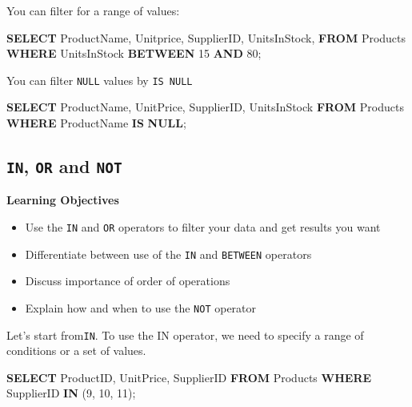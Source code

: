\documentclass[]{book}
\newenvironment{Shaded}{\begin{snugshade}}{\end{snugshade}}
\newcommand{\KeywordTok}[1]{\textcolor[rgb]{0.13,0.29,0.53}{\textbf{{#1}}}}
\newcommand{\DecValTok}[1]{\textcolor[rgb]{0.00,0.00,0.81}{{#1}}}
\newcommand{\NormalTok}[1]{{#1}}
\providecommand{\tightlist}{%
  \setlength{\itemsep}{0pt}\setlength{\parskip}{0pt}}
\theoremstyle{definition}
\theoremstyle{definition}
\theoremstyle{remark}
\begin{document}
You can filter for a range of values:

\begin{Shaded}
\begin{Highlighting}[]
\KeywordTok{SELECT} \NormalTok{ProductName,}
\NormalTok{Unitprice,}
\NormalTok{SupplierID,}
\NormalTok{UnitsInStock,}
\KeywordTok{FROM} \NormalTok{Products}
\KeywordTok{WHERE} \NormalTok{UnitsInStock }\KeywordTok{BETWEEN} \DecValTok{15} \KeywordTok{AND} \DecValTok{80}\NormalTok{;}
\end{Highlighting}
\end{Shaded}

You can filter \texttt{NULL} values by \texttt{IS\ NULL}

\begin{Shaded}
\begin{Highlighting}[]
\KeywordTok{SELECT} \NormalTok{ProductName,}
\NormalTok{UnitPrice,}
\NormalTok{SupplierID,}
\NormalTok{UnitsInStock}
\KeywordTok{FROM} \NormalTok{Products}
\KeywordTok{WHERE} \NormalTok{ProductName }\KeywordTok{IS} \KeywordTok{NULL}\NormalTok{;}
\end{Highlighting}
\end{Shaded}

\subsection{\texorpdfstring{\texttt{IN}, \texttt{OR} and
\texttt{NOT}}{IN, OR and NOT}}\label{in-or-and-not}

\textbf{Learning Objectives}

\begin{itemize}
\tightlist
\item
  Use the \texttt{IN} and \texttt{OR} operators to filter your data and
  get results you want
\item
  Differentiate between use of the \texttt{IN} and \texttt{BETWEEN}
  operators
\item
  Discuss importance of order of operations
\item
  Explain how and when to use the \texttt{NOT} operator
\end{itemize}

Let's start from\texttt{IN}. To use the IN operator, we need to specify
a range of conditions or a set of values.

\begin{Shaded}
\begin{Highlighting}[]
\KeywordTok{SELECT}
\NormalTok{ProductID,}
\NormalTok{UnitPrice,}
\NormalTok{SupplierID}
\KeywordTok{FROM} \NormalTok{Products}
\KeywordTok{WHERE} \NormalTok{SupplierID }\KeywordTok{IN} \NormalTok{(}\DecValTok{9}\NormalTok{, }\DecValTok{10}\NormalTok{, }\DecValTok{11}\NormalTok{);}
\end{Highlighting}
\end{Shaded}
\end{document}
